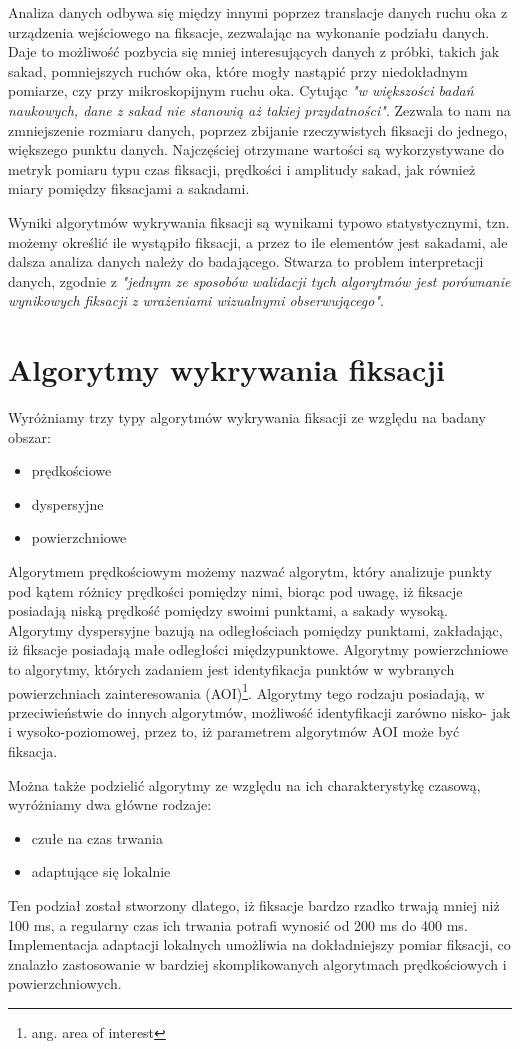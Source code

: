 Analiza danych odbywa się między innymi poprzez translacje danych ruchu oka z urządzenia wejściowego na fiksacje, zezwalając na wykonanie podziału danych. Daje to możliwość pozbycia się mniej interesujących danych z próbki, takich jak sakad, pomniejszych ruchów oka, które mogły nastąpić przy niedokładnym pomiarze, czy przy mikroskopijnym ruchu oka. Cytując \cite{Main} \emph{"w większości badań naukowych, dane z sakad nie stanowią aż takiej przydatności"}. Zezwala to nam na zmniejszenie rozmiaru danych, poprzez zbijanie rzeczywistych fiksacji do jednego, większego punktu danych. Najczęściej otrzymane wartości są wykorzystywane do metryk pomiaru typu czas fiksacji, prędkości i amplitudy sakad, jak również miary pomiędzy fiksacjami a sakadami.\par
Wyniki algorytmów wykrywania fiksacji są wynikami typowo statystycznymi, tzn. możemy określić ile wystąpiło fiksacji, a przez to ile elementów jest sakadami, ale dalsza analiza danych należy do badającego. Stwarza to problem interpretacji danych, zgodnie z \cite{Main} \emph{"jednym ze sposobów walidacji tych algorytmów jest porównanie wynikowych fiksacji z wrażeniami wizualnymi obserwującego"}.
\section{Algorytmy wykrywania fiksacji}
\label{sec:fixations}
Wyróżniamy trzy typy algorytmów wykrywania fiksacji ze względu na badany obszar:
\begin{itemize}
    \item prędkościowe
    \item dyspersyjne
    \item powierzchniowe
\end{itemize} 
Algorytmem prędkościowym możemy nazwać algorytm, który analizuje punkty pod kątem różnicy prędkości pomiędzy nimi, biorąc pod uwagę, iż fiksacje posiadają niską prędkość pomiędzy swoimi punktami, a sakady wysoką. Algorytmy dyspersyjne bazują na odległościach pomiędzy punktami, zakładając, iż fiksacje posiadają małe odległości międzypunktowe. Algorytmy powierzchniowe to algorytmy, których zadaniem jest identyfikacja punktów w wybranych powierzchniach zainteresowania (AOI)\footnote{ang. area of interest}. Algorytmy tego rodzaju posiadają, w przeciwieństwie do innych algorytmów, możliwość identyfikacji zarówno nisko- jak i wysoko-poziomowej, przez to, iż parametrem algorytmów AOI może być fiksacja.\par
Można także podzielić algorytmy ze względu na ich charakterystykę czasową, wyróżniamy dwa główne rodzaje:
\begin{itemize}
    \item czułe na czas trwania
    \item adaptujące się lokalnie
\end{itemize}
Ten podział został stworzony dlatego, iż fiksacje bardzo rzadko trwają mniej niż 100 ms, a regularny czas ich trwania potrafi wynosić od 200 ms do 400 ms. Implementacja adaptacji lokalnych umożliwia na dokładniejszy pomiar fiksacji, co znalazło zastosowanie w bardziej skomplikowanych algorytmach prędkościowych i powierzchniowych.
